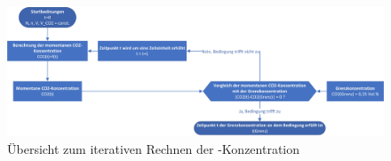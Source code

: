 \vspace{5mm}

\begin{figure}[h!]
	\centering
	\includegraphics[width=1.0\textwidth]{img/iterativ}
	\caption{Übersicht zum iterativen Rechnen der -Konzentration}
\end{figure}
\FloatBarrier

\newpage


